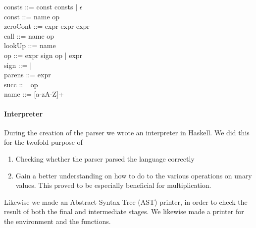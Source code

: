 consts ::= const \bnf{,} consts $\mid$ $\epsilon$\\

const ::= name \bnf{=} op\\

zeroCont ::=  \bnf{(} expr \bnf{)} \bnf{\{} expr \bnf{\}}  \bnf{\{} expr \bnf{\}}\\

call ::=  name op\\

lookUp ::=  name\\

op ::= expr sign op | expr\\

sign ::= \bnf{+} | \bnf{*}\\

parens ::=\bnf{(} expr \bnf{)}\\

succ ::=  op\\

name ::= [a-zA-Z]+

\paragraph{Interpreter}
During the creation of the parser we wrote an interpreter in
Haskell. We did this for the twofold purpose of
\begin{enumerate}
\item Checking whether the parser parsed the language correctly
\item Gain a better understanding on how to do to the various
  operations on unary values. This proved to be especially beneficial
  for multiplication.
\end{enumerate}
Likewise we made an Abstract Syntax Tree (AST) printer, in order to
check the result of both the final and intermediate stages. We
likewise made a printer for the environment and the functions.

